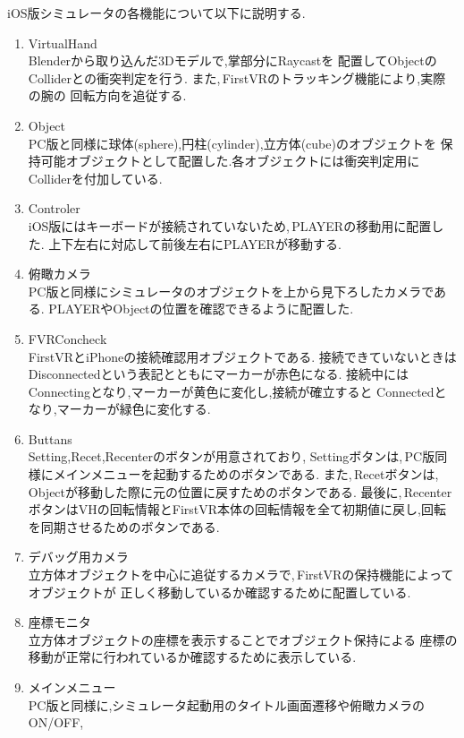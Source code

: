 \documentclass{ltjsreport}
\begin{document}
		iOS版シミュレータの各機能について以下に説明する.
		\begin{enumerate}
			\renewcommand{\labelenumi}{\textcircled{\scriptsize \theenumi}}
			\item VirtualHand\\
				Blenderから取り込んだ3Dモデルで,掌部分にRaycastを
				配置してObjectのColliderとの衝突判定を行う.
				また,\,FirstVRのトラッキング機能により,実際の腕の
				回転方向を追従する.
			\item Object\\
				PC版と同様に球体(sphere),円柱(cylinder),立方体(cube)のオブジェクトを
				保持可能オブジェクトとして配置した.各オブジェクトには衝突判定用にColliderを付加している.
			\item Controler\\
				iOS版にはキーボードが接続されていないため,\,PLAYERの移動用に配置した.
				上下左右に対応して前後左右にPLAYERが移動する.
			\item 俯瞰カメラ\\
				PC版と同様にシミュレータのオブジェクトを上から見下ろしたカメラである.
				PLAYERやObjectの位置を確認できるように配置した.
			\item FVRConcheck\\
				FirstVRとiPhoneの接続確認用オブジェクトである.
				接続できていないときはDisconnectedという表記とともにマーカーが赤色になる.
				接続中にはConnectingとなり,マーカーが黄色に変化し,接続が確立すると
				Connectedとなり,マーカーが緑色に変化する.
			\item Buttans\\
				Setting,Recet,Recenterのボタンが用意されており,
				Settingボタンは,\,PC版同様にメインメニューを起動するためのボタンである.
				また,\,Recetボタンは,\,Objectが移動した際に元の位置に戻すためのボタンである.
				最後に,\,RecenterボタンはVHの回転情報とFirstVR本体の回転情報を全て初期値に戻し,回転を同期させるためのボタンである.
			\item デバッグ用カメラ\\
				立方体オブジェクトを中心に追従するカメラで,\,FirstVRの保持機能によってオブジェクトが
				正しく移動しているか確認するために配置している.
			\item 座標モニタ\\
				立方体オブジェクトの座標を表示することでオブジェクト保持による
				座標の移動が正常に行われているか確認するために表示している.
			\item メインメニュー\\
				PC版と同様に,シミュレータ起動用のタイトル画面遷移や俯瞰カメラのON/OFF,

\end{enumerate}
\end{document}
